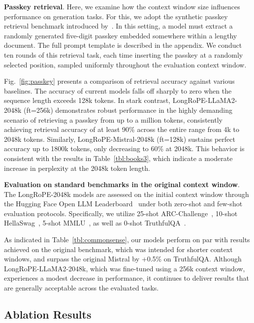 \textbf{Passkey retrieval}. Here, we examine how the context window size influences performance on generation tasks. For this, we adopt the synthetic passkey retrieval benchmark introduced by~\cite{passkey}. In this setting, a model must extract a randomly generated five-digit passkey embedded somewhere within a lengthy document. The full prompt template is described in the appendix. We conduct ten rounds of this retrieval task, each time inserting the passkey at a randomly selected position, sampled uniformly throughout the evaluation context window.

Fig.~\ref{fig:passkey} presents a comparison of retrieval accuracy against various baselines. The accuracy of current models falls off sharply to zero when the sequence length exceeds 128k tokens. In stark contrast, LongRoPE-LLaMA2-2048k (ft=256k) demonstrates robust performance in the highly demanding scenario of retrieving a passkey from up to a million tokens, consistently achieving retrieval accuracy of at least 90\% across the entire range from 4k to 2048k tokens. Similarly, LongRoPE-Mistral-2048k (ft=128k) sustains perfect accuracy up to 1800k tokens, only decreasing to 60\% at 2048k. This behavior is consistent with the results in Table~\ref{tbl:books3}, which indicate a moderate increase in perplexity at the 2048k token length.

\textbf{Evaluation on standard benchmarks in the original context window}. The LongRoPE-2048k models are assessed on the initial context window through the Hugging Face Open LLM Leaderboard~\cite{huggingfaceboard} under both zero-shot and few-shot evaluation protocols. Specifically, we utilize 25-shot ARC-Challenge~\cite{allenai:arc}, 10-shot HellaSwag~\cite{zellers2019hellaswag}, 5-shot MMLU~\cite{mmlu}, as well as 0-shot TruthfulQA~\cite{lin2021truthfulqa}.

As indicated in Table~\ref{tbl:commonsense}, our models perform on par with results achieved on the original benchmark, which was intended for shorter context windows, and surpass the original Mistral by +0.5\% on TruthfulQA. Although LongRoPE-LLaMA2-2048k, which was fine-tuned using a 256k context window, experiences a modest decrease in performance, it continues to deliver results that are generally acceptable across the evaluated tasks.

\subsection{Ablation Results}

